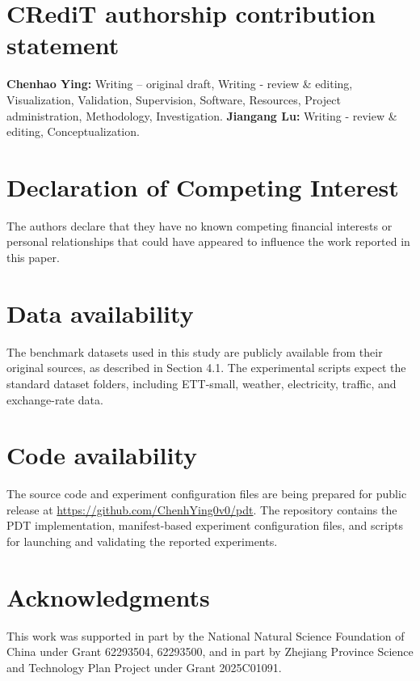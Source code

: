 \documentclass[final,3p,times]{elsarticle}
\begin{document}
\section*{CRediT authorship contribution statement}
\indent \textbf{Chenhao Ying:} Writing – original draft, Writing - review \& editing, Visualization, Validation, Supervision, Software, Resources, Project administration, Methodology, Investigation. \textbf{Jiangang Lu:} Writing - review \& editing, Conceptualization.

\section*{Declaration of Competing Interest}
\indent The authors declare that they have no known competing financial interests or personal relationships that could have appeared to influence the work reported in this paper.

\section*{Data availability}
The benchmark datasets used in this study are publicly available from their original sources, as described in Section 4.1. The experimental scripts expect the standard dataset folders, including ETT-small, weather, electricity, traffic, and exchange-rate data.

\section*{Code availability}
The source code and experiment configuration files are being prepared for public release at \url{https://github.com/ChenhYing0v0/pdt}. The repository contains the PDT implementation, manifest-based experiment configuration files, and scripts for launching and validating the reported experiments.

\section*{Acknowledgments}
This work was supported in part by the National Natural Science Foundation of China under Grant 62293504, 62293500, and in part by Zhejiang Province Science and Technology Plan Project under Grant 2025C01091.










\end{document}

